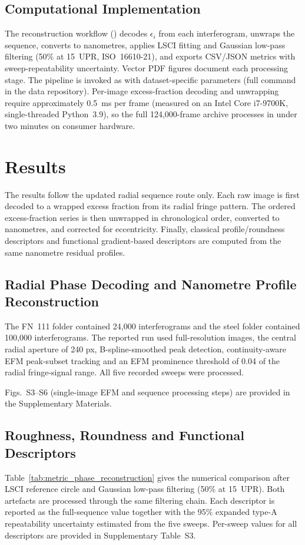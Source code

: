 \documentclass[review]{elsarticle}
\begin{document}
\subsection{Computational Implementation}
The reconstruction workflow () decodes $\epsilon_i$ from each interferogram, unwraps the sequence, converts to nanometres, applies LSCI fitting and Gaussian low-pass filtering (50\% at 15~UPR, ISO~16610-21), and exports CSV/JSON metrics with sweep-repeatability uncertainty. Vector PDF figures document each processing stage. The pipeline is invoked as  with dataset-specific parameters (full command in the data repository). Per-image excess-fraction decoding and unwrapping require approximately 0.5~ms per frame (measured on an Intel Core i7-9700K, single-threaded Python~3.9), so the full 124,000-frame archive processes in under two minutes on consumer hardware.

\section{Results}

The results follow the updated radial sequence route only. Each raw image is first decoded to a wrapped excess fraction from its radial fringe pattern. The ordered excess-fraction series is then unwrapped in chronological order, converted to nanometres, and corrected for eccentricity. Finally, classical profile/roundness descriptors and functional gradient-based descriptors are computed from the same nanometre residual profiles.

\subsection{Radial Phase Decoding and Nanometre Profile Reconstruction}
The FN~111 folder contained 24,000 interferograms and the steel folder contained 100,000 interferograms. The reported run used full-resolution images, the central radial aperture of 240 px, B-spline-smoothed peak detection, continuity-aware EFM peak-subset tracking and an EFM prominence threshold of 0.04 of the radial fringe-signal range. All five recorded sweeps were processed.

Figs.~S3--S6 (single-image EFM and sequence processing steps) are provided in the Supplementary Materials.

\subsection{Roughness, Roundness and Functional Descriptors}
Table~\ref{tab:metric_phase_reconstruction} gives the numerical comparison after LSCI reference circle and Gaussian low-pass filtering (50\% at 15~UPR). Both artefacts are processed through the same filtering chain. Each descriptor is reported as the full-sequence value together with the 95\% expanded type-A repeatability uncertainty estimated from the five sweeps. Per-sweep values for all descriptors are provided in Supplementary Table~S3.
\end{document}
